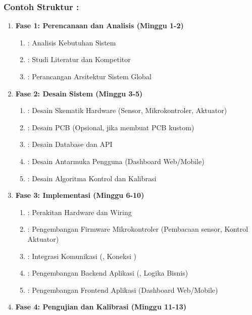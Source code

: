 \documentclass{elsinta}
\begin{document}
\subsubsection*{Contoh Struktur :}
\begin{enumerate}
    \item \textbf{Fase 1: Perencanaan dan Analisis (Minggu 1-2)}
    \begin{enumerate}
        \item {}: Analisis Kebutuhan Sistem
        \item {}: Studi Literatur dan Kompetitor
        \item {}: Perancangan Arsitektur Sistem Global
    \end{enumerate}
    \item \textbf{Fase 2: Desain Sistem (Minggu 3-5)}
    \begin{enumerate}
        \item {}: Desain Skematik Hardware (Sensor, Mikrokontroler, Aktuator)
        \item {}: Desain PCB (Opsional, jika membuat PCB kustom)
        \item {}: Desain Database dan API 
        \item {}: Desain Antarmuka Pengguna (Dashboard Web/Mobile)
        \item {}: Desain Algoritma Kontrol dan Kalibrasi
    \end{enumerate}
    \item \textbf{Fase 3: Implementasi (Minggu 6-10)}
    \begin{enumerate}
        \item {}: Perakitan Hardware dan Wiring
        \item {}: Pengembangan Firmware Mikrokontroler (Pembacaan sensor, Kontrol Aktuator)
        \item {}: Integrasi Komunikasi  (, Koneksi )
        \item {}: Pengembangan Backend Aplikasi (, Logika Bisnis)
        \item {}: Pengembangan Frontend Aplikasi (Dashboard Web/Mobile)
    \end{enumerate}
    \item \textbf{Fase 4: Pengujian dan Kalibrasi (Minggu 11-13)}
    \begin{enumerate}

\end{enumerate}
\end{enumerate}
\end{document}
